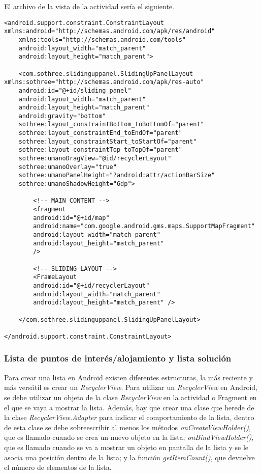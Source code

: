 \newpage
El archivo de la vista de la actividad sería el siguiente.
\begin{lstlisting}[caption=Código XML de la vista de la actividad principal]
<android.support.constraint.ConstraintLayout xmlns:android="http://schemas.android.com/apk/res/android"
	xmlns:tools="http://schemas.android.com/tools"
	android:layout_width="match_parent"
	android:layout_height="match_parent">

	<com.sothree.slidinguppanel.SlidingUpPanelLayout xmlns:sothree="http://schemas.android.com/apk/res-auto"
	android:id="@+id/sliding_panel"
	android:layout_width="match_parent"
	android:layout_height="match_parent"
	android:gravity="bottom"
	sothree:layout_constraintBottom_toBottomOf="parent"
	sothree:layout_constraintEnd_toEndOf="parent"
	sothree:layout_constraintStart_toStartOf="parent"
	sothree:layout_constraintTop_toTopOf="parent"
	sothree:umanoDragView="@id/recyclerLayout"
	sothree:umanoOverlay="true"
	sothree:umanoPanelHeight="?android:attr/actionBarSize"
	sothree:umanoShadowHeight="6dp">

		<!-- MAIN CONTENT -->
		<fragment
		android:id="@+id/map"
		android:name="com.google.android.gms.maps.SupportMapFragment"
		android:layout_width="match_parent"
		android:layout_height="match_parent"
		/>
		
		<!-- SLIDING LAYOUT -->
		<FrameLayout
		android:id="@+id/recyclerLayout"
		android:layout_width="match_parent"
		android:layout_height="match_parent" />
	
	</com.sothree.slidinguppanel.SlidingUpPanelLayout>

</android.support.constraint.ConstraintLayout>
\end{lstlisting}
\subsubsection{Lista de puntos de interés/alojamiento y lista solución}
Para crear una lista en Android existen diferentes estructuras, la más reciente y más versátil es crear un \textit{RecyclerView}. Para utilizar un \textit{RecyclerView} en Android, se debe utilizar un objeto de la clase \textit{RecyclerView} en la actividad o Fragment en el que se vaya a mostrar la lista. Además, hay que crear una clase que herede de la clase \textit{RecyclerView.Adapter} para indicar el comportamiento de la lista, dentro de esta clase se debe sobreescribir al menos los métodos \textit{onCreateViewHolder()}, que es llamado cuando se crea un nuevo objeto en la lista; \textit{onBindViewHolder()}, que es llamado cuando se va a mostrar un objeto en pantalla de la lista y se le asocia una posición dentro de la lista; y la función \textit{getItemCount()}, que devuelve el número de elementos de la lista.\newline

